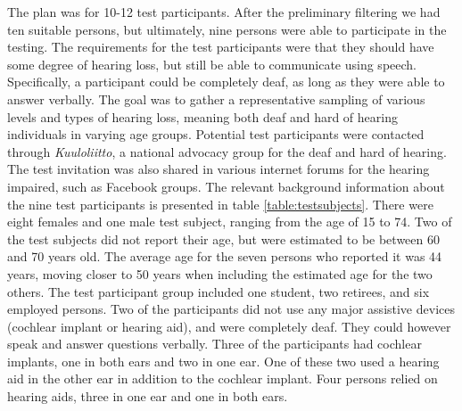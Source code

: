 \documentclass[english, 12pt, a4paper, pdftex, elec, utf8]{aaltothesis}
\begin{document}
The plan was for 10-12 test participants. After the preliminary filtering we had ten suitable persons, but ultimately, nine persons were able to participate in the testing. The requirements for the test participants were that they should have some degree of hearing loss, but still be able to communicate using speech. Specifically, a participant could be completely deaf, as long as they were able to answer verbally. The goal was to gather a representative sampling of various levels and types of hearing loss, meaning both deaf and hard of hearing individuals in varying age groups. Potential test participants were contacted through \textit{Kuuloliitto}, a national advocacy group for the deaf and hard of hearing. The test invitation was also shared in various internet forums for the hearing impaired, such as Facebook groups. The relevant background information about the nine test participants is presented in table \ref{table:testsubjects}. There were eight females and one male test subject, ranging from the age of 15 to 74. Two of the test subjects did not report their age, but were estimated to be between 60 and 70 years old. The average age for the seven persons who reported it was 44 years, moving closer to 50 years when including the estimated age for the two others. The test participant group included one student, two retirees, and six employed persons. Two of the participants did not use any major assistive devices (cochlear implant or hearing aid), and were completely deaf. They could however speak and answer questions verbally. Three of the participants had cochlear implants, one in both ears and two in one ear. One of these two used a hearing aid in the other ear in addition to the cochlear implant. Four persons relied on hearing aids, three in one ear and one in both ears. \\
\end{document}
